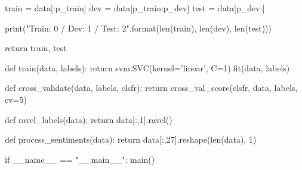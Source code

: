 \documentclass{article} %
\begin{document}
\begin{python}
  train = data[:p_train]
  dev = data[p_train:p_dev]
  test = data[p_dev:]

  print("Train: {0} / Dev: {1} / Test: {2}".format(len(train), len(dev), len(test)))

  return train, test

def train(data, labels):
  return svm.SVC(kernel='linear', C=1).fit(data, labels)

def cross_validate(data, labels, clsfr):
  return cross_val_score(clsfr, data, labels, cv=5)

def ravel_labels(data):
  return data[:,1].ravel()

def process_sentiments(data):
  return data[:,27].reshape(len(data), 1)

if __name__ == "__main__":
  main()
\end{python}
\end{document}
